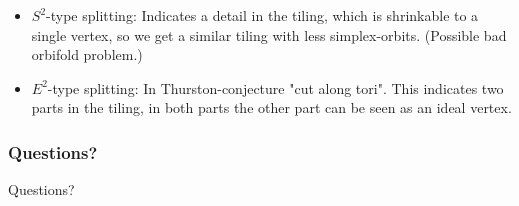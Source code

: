   \begin{itemize}
    \item $S^2$-type splitting: Indicates a detail in the tiling, which is
      shrinkable to a single vertex, so we get a similar tiling  with less simplex-orbits. (Possible bad
      orbifold problem.) 
    \item $E^2$-type splitting: In Thurston-conjecture "cut along tori". This
      indicates two parts in the tiling, in both parts the other part
      can be seen as an ideal vertex. 
  \end{itemize}                      

\begin{frame}
  \nocite{DHM93,D87,Du88,H93,LM90,Ma67,M94,T82,VS93,F94,F03}
  
  
\end{frame}

\begin{frame}
  \frametitle{Questions?}
  \center\large Questions?
\end{frame}


